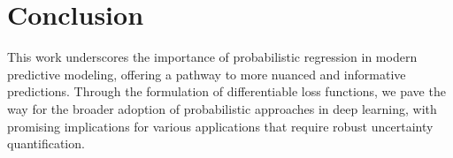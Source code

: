 \documentclass{article}
\begin{document}
\section{Conclusion}
This work underscores the importance of probabilistic regression in modern predictive modeling, offering a pathway to more nuanced and informative predictions. Through the formulation of differentiable loss functions, we pave the way for the broader adoption of probabilistic approaches in deep learning, with promising implications for various applications that require robust uncertainty quantification.
\end{document}
